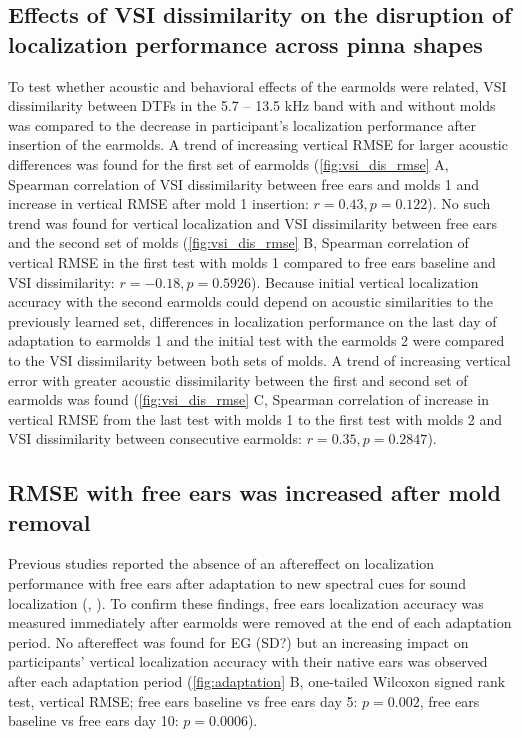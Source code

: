 \subsection{Effects of VSI dissimilarity on the disruption of localization performance across pinna shapes}

To test whether acoustic and behavioral effects of the earmolds were related, VSI dissimilarity between DTFs in the 5.7 – 13.5 kHz band with and without molds was compared to the decrease in participant’s localization performance after insertion of the earmolds. A trend of increasing vertical RMSE for larger acoustic differences was found for the first set of earmolds (\cref{fig:vsi_dis_rmse} A, Spearman correlation of VSI dissimilarity between free ears and molds 1 and increase in vertical RMSE after mold 1 insertion: $r = 0.43, p = 0.122$). No such trend was found for vertical localization and VSI dissimilarity between free ears and the second set of molds (\cref{fig:vsi_dis_rmse} B, Spearman correlation of vertical RMSE in the first test with molds 1 compared to free ears baseline and VSI dissimilarity: $r = - 0.18, p = 0.5926$). Because initial vertical localization accuracy with the second earmolds could depend on acoustic similarities to the previously learned set, differences in localization performance on the last day of adaptation to earmolds 1 and the initial test with the earmolds 2 were compared to the VSI dissimilarity between both sets of molds. A trend of increasing vertical error with greater acoustic dissimilarity between the first and second set of earmolds was found (\cref{fig:vsi_dis_rmse} C, Spearman correlation of increase in vertical RMSE from the last test with molds 1 to the first test with molds 2 and VSI dissimilarity between consecutive earmolds: $r = 0.35, p = 0.2847$). 

\subsection{RMSE with free ears was increased after mold removal}

Previous studies reported the absence of an aftereffect on localization performance with free ears after adaptation to new spectral cues for sound localization (\citet{hofman_relearning_1998}, \citet{trapeau_fast_2016}). To confirm these findings, free ears localization accuracy was measured immediately after earmolds were removed at the end of each adaptation period. No aftereffect was found for EG (SD?) but an increasing impact on participants’ vertical localization accuracy with their native ears was observed after each adaptation period (\cref{fig:adaptation} B, one-tailed Wilcoxon signed rank test, vertical RMSE; free ears baseline vs free ears day 5: $p = 0.002$, free ears baseline vs free ears day 10: $p = 0.0006$). 

